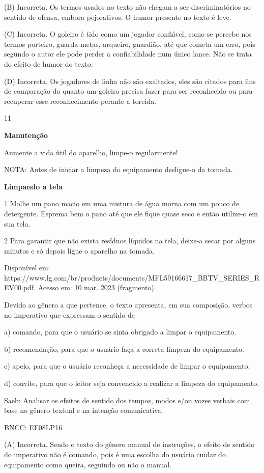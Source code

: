 (B) Incorreta. Os termos usados no texto não chegam a ser
discriminatórios no sentido de ofensa, embora pejorativos. O humor
presente no texto é leve.

(C) Incorreta. O goleiro é tido como um jogador confiável, como se
percebe nos termos porteiro, guarda-metas, arqueiro, guardião, até que
cometa um erro, pois segundo o autor ele pode perder a confiabilidade
num único lance. Não se trata do efeito de humor do texto.

(D) Incorreta. Os jogadores de linha não são exaltados, eles são citados
para fins de comparação do quanto um goleiro precisa fazer para ser
reconhecido ou para recuperar esse reconhecimento perante a torcida.

\num{11}

\textbf{Manutenção}

Aumente a vida útil do aparelho, limpe-o regularmente!

NOTA: Antes de iniciar a limpeza do equipamento desligue-o da tomada.

\textbf{Limpando a tela}

\num{1} Molhe um pano macio em uma mistura de água morna com um pouco de
detergente. Esprema bem o pano até que ele fique quase seco e então
utilize-o em sua tela.

\num{2} Para garantir que não exista resíduos líquidos na tela, deixe-a
secar por alguns minutos e só depois ligue o aparelho na tomada.

Disponível em:
https://www.lg.com/br/products/documents/MFL59166617\_BBTV\_SERIES\_REV00.pdf.
Acesso em: 10 mar. 2023 (fragmento).

Devido ao gênero a que pertence, o texto apresenta, em sua composição,
verbos no imperativo que expressam o sentido de

a) comando, para que o usuário se sinta obrigado a limpar o equipamento.

b) recomendação, para que o usuário faça a correta limpeza do
equipamento.

c) apelo, para que o usuário reconheça a necessidade de limpar o
equipamento.

d) convite, para que o leitor seja convencido a realizar a limpeza do
equipamento.

Saeb: Analisar os efeitos de sentido dos tempos, modos e/ou vozes
verbais com base no gênero textual e na intenção comunicativa.

BNCC: EF08LP16

(A) Incorreta. Sendo o texto do gênero manual de instruções, o efeito de
sentido do imperativo não é comando, pois é uma escolha do usuário
cuidar do equipamento como queira, seguindo ou não o manual.

